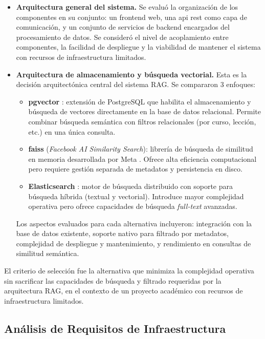 \begin{itemize}
    \item \textbf{Arquitectura general del sistema.} Se evaluó la organización de los componentes en su conjunto: un frontend web,
una \Gls{api} \Gls{rest} \cite{fielding2000rest} como capa de comunicación, y un conjunto de servicios de backend encargados del procesamiento de datos. Se consideró el nivel de acoplamiento entre componentes, la facilidad de despliegue y la viabilidad de mantener el sistema con recursos de infraestructura limitados.
    \item \textbf{Arquitectura de almacenamiento y búsqueda vectorial.} Esta es la decisión arquitectónica central del sistema
RAG. Se compararon 3 enfoques:
    \begin{itemize}
        \item \textbf{pgvector} \cite{misc_pgvector}: extensión de PostgreSQL que habilita el almacenamiento y búsqueda de vectores directamente en la
base de datos relacional. Permite combinar búsqueda semántica con filtros relacionales (por curso, lección, etc.) en una única
consulta.
        \item \textbf{\acrshort{faiss}} (\textit{Facebook AI Similarity Search}): librería de búsqueda de similitud en memoria desarrollada
por Meta \cite{douze2025faiss}. Ofrece alta eficiencia computacional pero requiere gestión separada de metadatos y persistencia en disco.
        \item \textbf{Elasticsearch} \cite{gormley2015elasticsearch}: motor de búsqueda distribuido con soporte para búsqueda híbrida (textual y vectorial).
Introduce mayor complejidad operativa pero ofrece capacidades de búsqueda \textit{full-text} avanzadas.
    \end{itemize}
    Los aspectos evaluados para cada alternativa incluyeron: integración con la base de datos existente, soporte nativo para filtrado
por metadatos, complejidad de despliegue y mantenimiento, y rendimiento en consultas de similitud semántica.
\end{itemize}

El criterio de selección fue la alternativa que minimiza la complejidad operativa sin sacrificar las capacidades de búsqueda y
filtrado requeridas por la arquitectura RAG, en el contexto de un proyecto académico con recursos de infraestructura
limitados.

\subsection{Análisis de Requisitos de Infraestructura}
\label{subsection:3-RNF5:analisis-infraestructura}

